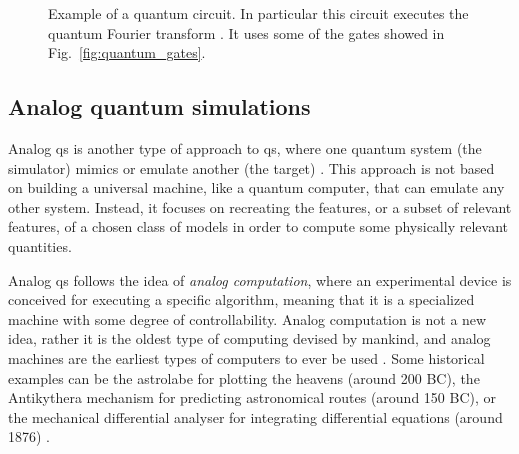 \begin{figure}[t]
    \centering
    \scalebox{0.75}{}
    \caption{
        Example of a quantum circuit.
        In particular this circuit executes the quantum Fourier transform \cite{nielsen2010quantum}.
        It uses some of the gates showed in Fig.~\ref{fig:quantum_gates}.
    }
    \label{fig:quantum_fourier}
\end{figure}


%
%
\subsection{Analog quantum simulations}
\label{sub:analog_quantum_simulations}

Analog \ac{qs} is another type of approach to \ac{qs}, where one quantum system (the simulator) mimics or emulate another (the target) \cite{buluta2009simulators, wei1997simulation, arguello2019simulation, aspuruguzik2012photonic, blatt2012trappedions, bloch2012ultracold, houck2012superconducting, lewenstein2012ultracold}.
This approach is not based on building a universal machine, like a quantum computer, that can emulate any other system.
Instead, it focuses on recreating the features, or a subset of relevant features, of a chosen class of models in order to compute some physically relevant quantities.

Analog \ac{qs} follows the idea of \emph{analog computation}, where an experimental device is conceived for executing a specific algorithm, meaning that it is a specialized machine with some degree of controllability.
Analog computation is not a new idea, rather it is the oldest type of computing devised by mankind, and analog machines are the earliest types of computers to ever be used \cite{kendon2010quantum}.
Some historical examples can be the astrolabe for plotting the heavens (around 200 BC), the Antikythera mechanism for predicting astronomical routes (around 150 BC), or the mechanical differential analyser for integrating differential equations (around 1876) \cite{thomson1876integration}.

